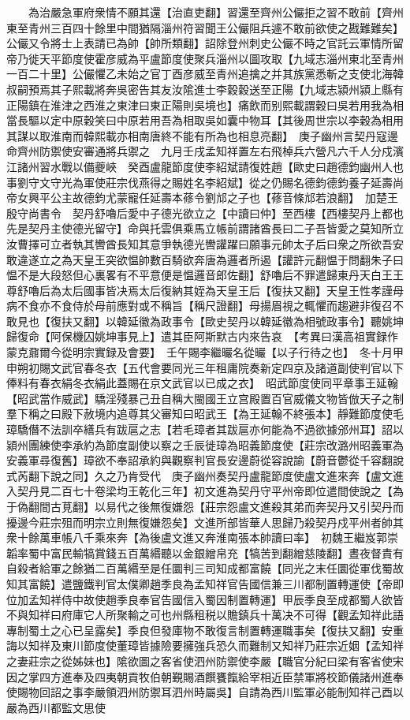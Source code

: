 　　為治嚴急軍府衆情不願其還【治直吏翻】習還至齊州公儼拒之習不敢前【齊州東至青州三百四十餘里中間猶隔淄州符習聞王公儼阻兵遽不敢前欲使之戡難難矣】公儼又令將士上表請已為帥【帥所類翻】詔除登州刺史公儼不時之官託云軍情所留帝乃徙天平節度使霍彦威為平盧節度使聚兵淄州以圖攻取【九域志淄州東北至青州一百二十里】公儼懼乙未始之官丁酉彦威至青州追擒之并其族黨悉斬之支使北海韓叔嗣預焉其子熙載將奔吳密告其友汝隂進士李穀穀送至正陽【九域志潁州潁上縣有正陽鎮在淮津之西淮之東津曰東正陽則吳境也】痛飲而别熙載謂穀曰吳若用我為相當長驅以定中原穀笑曰中原若用吾為相取吳如囊中物耳【其後周世宗以李穀為相用其謀以取淮南而韓熙載亦相南唐終不能有所為也相息亮翻】　庚子幽州言契丹寇邊命齊州防禦使安審通將兵禦之　九月壬戌孟知祥置左右飛棹兵六營凡六千人分戍濱江諸州習水戰以備夔峽　癸酉盧龍節度使李紹斌請復姓趙【歐史曰趙德鈞幽州人也事劉守文守光為軍使莊宗伐燕得之賜姓名李紹斌】從之仍賜名德鈞德鈞養子延壽尚帝女興平公主故德鈞尤蒙寵任延壽本蓚令劉邟之子也【蓚音條邟若浪翻】　加楚王殷守尚書令　契丹舒嚕后愛中子德光欲立之【中讀曰仲】至西樓【西樓契丹上都也先是契丹主使德光留守】命與托雲俱乘馬立帳前謂諸酋長曰二子吾皆愛之莫知所立汝曹擇可立者執其轡酋長知其意爭執德光轡讙躍曰願事元帥太子后曰衆之所欲吾安敢違遂立之為天皇王突欲愠帥數百騎欲奔唐為邏者所遏【讙許元翻愠于問翻朱子曰愠不是大段怒但心裏畧有不平意便是愠邏音郎佐翻】舒嚕后不罪遣歸東丹天白王王尊舒嚕后為太后國事皆决焉太后復納其姪為天皇王后【復扶又翻】天皇王性孝謹母病不食亦不食侍於母前應對或不稱旨【稱尺證翻】母揚眉視之輒懼而趨避非復召不敢見也【復扶又翻】以韓延徽為政事令【歐史契丹以韓延徽為相號政事令】聽姚坤歸復命【阿保機囚姚坤事見上】遣其臣阿斯默古内來告哀　【考異曰漢高祖實録作蒙克鼐爾今從明宗實録及會要】　壬午賜李繼曮名從曮【以子行待之也】　冬十月甲申朔初賜文武官春冬衣【五代會要同光三年租庸院奏新定四京及諸道副使判官以下俸料有春衣絹冬衣絹此蓋賜在京文武官以已成之衣】　昭武節度使同平章事王延翰【昭武當作威武】驕淫殘暴己丑自稱大閩國王立宫殿置百官威儀文物皆倣天子之制羣下稱之曰殿下赦境内追尊其父審知曰昭武王【為王延翰不終張本】靜難節度使毛璋驕僭不法訓卒繕兵有跋扈之志【若毛璋者其跋扈亦何能為不過欲據邠州耳】詔以潁州團練使李承約為節度副使以察之壬辰徙璋為昭義節度使【莊宗改潞州昭義軍為安義軍尋復舊】璋欲不奉詔承約與觀察判官長安邊蔚從容說諭【蔚音鬱從千容翻說式芮翻下說之同】久之乃肯受代　庚子幽州奏契丹盧龍節度使盧文進來奔【盧文進入契丹見二百七十卷梁均王乾化三年】初文進為契丹守平州帝即位遣間使說之【為于偽翻間古莧翻】以易代之後無復嫌怨【莊宗怨盧文進殺其弟而奔契丹又引契丹而擾邊今莊宗殂而明宗立則無復嫌怨矣】文進所部皆華人思歸乃殺契丹戍平州者帥其衆十餘萬車帳八千乘來奔【為後盧文進又奔淮南張本帥讀曰率】　初魏王繼岌郭崇韜率蜀中富民輸犒賞錢五百萬緡聽以金銀繒帛充【犒苦到翻繒慈陵翻】晝夜督責有自殺者給軍之餘猶二百萬緡至是任圜判三司知成都富饒【同光之末任圜從軍伐蜀故知其富饒】遣鹽鐵判官太僕卿趙季良為孟知祥官告國信兼三川都制置轉運使【帝即位加孟知祥侍中故使趙季良奉官告國信入蜀因制置轉運】甲辰季良至成都蜀人欲皆不與知祥曰府庫它人所聚輸之可也州縣租税以贍鎮兵十萬决不可得【觀孟知祥此語專制蜀土之心已呈露矣】季良但發庫物不敢復言制置轉運職事矣【復扶又翻】安重誨以知祥及東川節度使董璋皆據險要擁強兵恐久而難制又知祥乃莊宗近姻【孟知祥之妻莊宗之從姊妹也】隂欲圖之客省使泗州防禦使李嚴【職官分紀曰梁有客省使宋因之掌四方進奉及四夷朝貢牧伯朝覲賜酒饌饔餼給宰相近臣禁軍將校節儀諸州進奉使賜物回詔之事李嚴領泗州防禦耳泗州時屬吳】自請為西川監軍必能制知祥己酉以嚴為西川都監文思使
